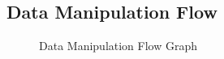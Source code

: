 \begin{appendices}
\section{Data Manipulation Flow}
\begin{figure}[H]
    \centering
    \caption{ Data Manipulation Flow Graph }
    \label{fig: Data_Manipulation_Flow_Graph}
\end{figure}

\newpage
\end{appendices}